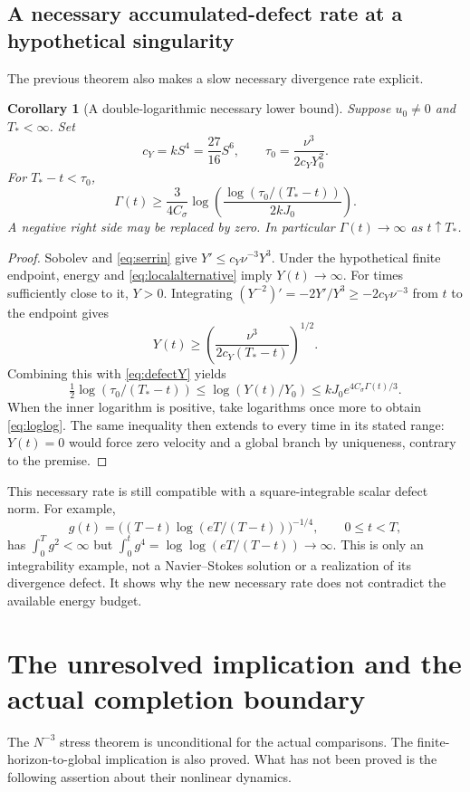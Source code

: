 \documentclass[11pt,a4paper]{article}
\newtheorem{corollary}[theorem]{Corollary}
\theoremstyle{definition}\newtheorem{definition}[theorem]{Definition}
\theoremstyle{remark}\newtheorem{remark}[theorem]{Remark}
\newcommand{\Csg}{C_\sigma}
\numberwithin{equation}{section}
\begin{document}
\subsection{A necessary accumulated-defect rate at a hypothetical singularity}
The previous theorem also makes a slow necessary divergence rate explicit.

\begin{corollary}[A double-logarithmic necessary lower bound]\label{cor:loglog}
Suppose $u_0\ne0$ and $T_*<\infty$. Set
\begin{equation}\label{eq:tau0}
 c_Y=kS^4=\frac{27}{16}S^6,\qquad
 \tau_0=\frac{\nu^3}{2c_YY_0^2}.
\end{equation}
For $T_*-t<\tau_0$,
\begin{equation}\label{eq:loglog}
 \Gamma(t)\ge\frac3{4\Csg}
 \log\left(\frac{\log(\tau_0/(T_*-t))}{2kJ_0}\right).
\end{equation}
A negative right side may be replaced by zero. In particular $\Gamma(t)\to\infty$ as $t\uparrow T_*$.
\end{corollary}
\begin{proof}
Sobolev and \eqref{eq:serrin} give $Y'\le c_Y\nu^{-3}Y^3$. Under the hypothetical finite endpoint, energy and \eqref{eq:localalternative} imply $Y(t)\to\infty$. For times sufficiently close to it, $Y>0$. Integrating
$(Y^{-2})'=-2Y'/Y^3\ge-2c_Y\nu^{-3}$ from $t$ to the endpoint gives
\[
 Y(t)\ge\left(\frac{\nu^3}{2c_Y(T_*-t)}\right)^{1/2}.
\]
Combining this with \eqref{eq:defectY} yields
\[
 \tfrac12\log(\tau_0/(T_*-t))
 \le\log(Y(t)/Y_0)
 \le kJ_0e^{4\Csg \Gamma(t)/3}.
\]
When the inner logarithm is positive, take logarithms once more to obtain \eqref{eq:loglog}. The same inequality then extends to every time in its stated range: $Y(t)=0$ would force zero velocity and a global branch by uniqueness, contrary to the premise.
\end{proof}

This necessary rate is still compatible with a square-integrable scalar defect norm. For example,
\[
 g(t)=\bigl((T-t)\log(eT/(T-t))\bigr)^{-1/4},\qquad0\le t<T,
\]
has $\int_0^Tg^2<\infty$ but $\int_0^t g^4=\log\log(eT/(T-t))\to\infty$. This is only an integrability example, not a Navier--Stokes solution or a realization of its divergence defect. It shows why the new necessary rate does not contradict the available energy budget.

\section{The unresolved implication and the actual completion boundary}
\label{sec:boundary}
The $N^{-3}$ stress theorem is unconditional for the actual comparisons. The finite-horizon-to-global implication is also proved. What has not been proved is the following assertion about their nonlinear dynamics.
\end{document}
